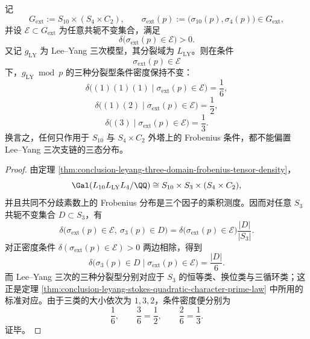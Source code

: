 \begin{theorem}\label{thm:conclusion-leyang-external-tower-conditional-splitting-invariance}
记
\[
G_{\mathrm{ext}}:=S_{10}\times (S_4\times C_2),
\qquad
\sigma_{\mathrm{ext}}(p):=\bigl(\sigma_{10}(p),\sigma_4(p)\bigr)\in G_{\mathrm{ext}},
\]
并设 \(\mathcal E\subset G_{\mathrm{ext}}\) 为任意共轭不变集合，满足
\[
\delta\bigl(\sigma_{\mathrm{ext}}(p)\in \mathcal E\bigr)>0.
\]
又记 \(g_{\mathrm{LY}}\) 为 Lee--Yang 三次模型，其分裂域为 \(L_{\mathrm{LY}}\)。则在条件
\[
\sigma_{\mathrm{ext}}(p)\in \mathcal E
\]
下，\(g_{\mathrm{LY}}\bmod p\) 的三种分裂型条件密度保持不变：
\[
\delta\!\bigl((1)(1)(1)\mid \sigma_{\mathrm{ext}}(p)\in\mathcal E\bigr)=\frac16,
\]
\[
\delta\!\bigl((1)(2)\mid \sigma_{\mathrm{ext}}(p)\in\mathcal E\bigr)=\frac12,
\]
\[
\delta\!\bigl((3)\mid \sigma_{\mathrm{ext}}(p)\in\mathcal E\bigr)=\frac13.
\]
换言之，任何只作用于 \(S_{10}\) 与 \(S_4\times C_2\) 外塔上的 Frobenius 条件，都不能偏置 Lee--Yang 三次支链的三态分布。
\end{theorem}
\begin{proof}
由定理 \ref{thm:conclusion-leyang-three-domain-frobenius-tensor-density}，
\[
\Gal(L_{10}L_{\mathrm{LY}}L_4/\QQ)
\cong
S_{10}\times S_3\times (S_4\times C_2),
\]
并且共同不分歧素数上的 Frobenius 分布是三个因子的乘积测度。因而对任意 \(S_3\) 共轭不变集合 \(D\subset S_3\)，有
\[
\delta\bigl(\sigma_{\mathrm{ext}}(p)\in\mathcal E,\ \sigma_3(p)\in D\bigr)
=
\delta\bigl(\sigma_{\mathrm{ext}}(p)\in\mathcal E\bigr)\frac{|D|}{|S_3|}.
\]
对正密度条件 \(\delta(\sigma_{\mathrm{ext}}(p)\in\mathcal E)>0\) 两边相除，得到
\[
\delta\bigl(\sigma_3(p)\in D\mid \sigma_{\mathrm{ext}}(p)\in\mathcal E\bigr)=\frac{|D|}{6}.
\]
而 Lee--Yang 三次的三种分裂型分别对应于 \(S_3\) 的恒等类、换位类与三循环类；这正是定理 \ref{thm:conclusion-leyang-stokes-quadratic-character-prime-law} 中所用的标准对应。由于三类的大小依次为 \(1,3,2\)，条件密度便分别为
\[
\frac16,\qquad \frac36=\frac12,\qquad \frac26=\frac13.
\]
证毕。
\end{proof}

